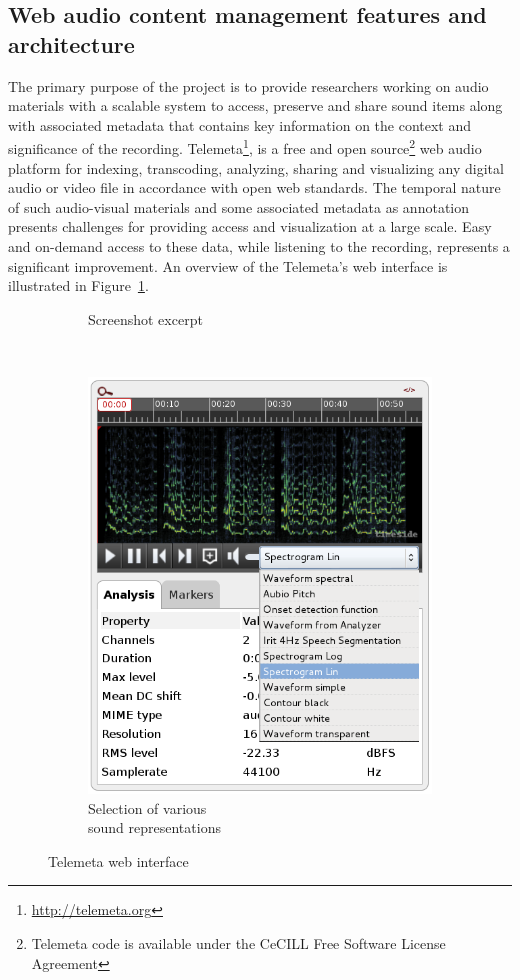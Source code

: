 \documentclass{sig-alternate}
\begin{document}
 \subsection{Web audio content management features and architecture}
The primary purpose of the project is to provide researchers working on audio materials with a scalable system to access, preserve and share sound items along with associated metadata that contains key information on the context and significance of the recording.
Tele\-meta\footnote{\url{http://telemeta.org}}, is a free and open source\footnote{Telemeta code is available under the CeCILL Free Software License Agreement} web audio platform for indexing, transcoding, analyzing, sharing and visualizing any digital audio or video file in accordance with open web standards.
The temporal nature of such audio-visual materials and some associated metadata as annotation presents challenges for providing access and visualization at a large scale. Easy and on-demand access to these data, while listening to the recording, represents a significant improvement.
An overview of the Telemeta's web interface is illustrated in Figure~\ref{fig:Telemeta}.
\begin{figure}[htb]
   \centering
   \begin{subfigure}[b]{0.7\textwidth}
     \caption{Screenshot excerpt}
     \label{fig:Telemeta}
   \end{subfigure}%
 ~ %
\begin{subfigure}[b]{0.3\textwidth}
  \centering
  \includegraphics[width=0.9\linewidth]{img/sound_representation.png}
  \caption{Selection of various \\sound representations}
  \label{fig:sound_representation}
\end{subfigure}
\caption{Telemeta web interface}
 \end{figure}
\end{document}
